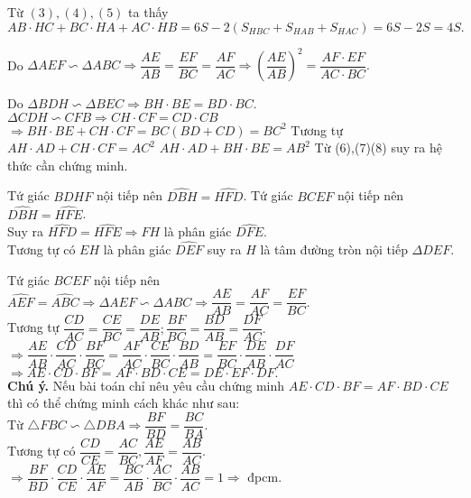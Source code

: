 \begin{bt}
{\begin{listEX}
\noindent	Từ $ (3),(4),(5) $ ta thấy $$ AB\cdot HC +BC\cdot HA +AC\cdot HB  =6S -2(S_{HBC}+S_{HAB}+S_{HAC}) =6S-2S=4S. $$
\item Do $ \Delta AEF \backsim \Delta ABC \Rightarrow \dfrac{AE}{AB}=\dfrac{EF}{BC}=\dfrac{AF}{AC}\Rightarrow \left( \dfrac{AE}{AB}\right)^2 =\dfrac{AF\cdot EF}{AC\cdot BC}. $
\item Do $ \Delta BDH \backsim \Delta BEC \Rightarrow BH\cdot BE =BD\cdot BC. $\\
$ \Delta CDH \backsim CFB \Rightarrow CH \cdot CF =CD\cdot CB$\\
$\Rightarrow BH\cdot BE +CH\cdot CF =BC\left (BD +CD\right ) =BC^2 $ 
Tương tự $ AH\cdot AD +CH\cdot CF =AC^2 $
$ AH\cdot AD +BH\cdot BE =AB^2 $ 
Từ (6),(7)(8) suy ra hệ thức cần chứng minh.
\item Tứ giác $ BDHF $ nội tiếp nên $ \widehat{DBH} =\widehat{HFD} $. Tứ giác $ BCEF $ nội tiếp nên $ \widehat{DBH} =\widehat{HFE} $.\\
Suy ra $ \widehat{HFD} =\widehat{HFE}\Rightarrow FH $ là phân giác $ \widehat{DFE}. $\\
Tương tự có $ EH $ là phân giác $ \widehat{DEF} $ suy ra $ H $ là tâm đường tròn nội tiếp $ \Delta DEF. $
\item Tứ giác $ BCEF $ nội tiếp nên $ \widehat{AEF} =\widehat{ABC}\Rightarrow \Delta AEF \backsim \Delta ABC \Rightarrow \dfrac{AE}{AB}=\dfrac{AF}{AC}=\dfrac{EF}{BC}.$\\
Tương tự $ \dfrac{CD}{AC}=\dfrac{CE}{BC}=\dfrac{DE}{AB}; \dfrac{BF}{BC}=\dfrac{BD}{AB}=\dfrac{DF}{AC}. $\\
$\Rightarrow \dfrac{AE}{AB}\cdot \dfrac{CD}{AC}\cdot \dfrac{BF}{BC} =\dfrac{AF}{AC}\cdot \dfrac{CE}{BC}\cdot \dfrac{BD}{AB}=\dfrac{EF}{BC}\cdot \dfrac{DE}{AB}\cdot \dfrac{DF}{AC} $\\
$ \Rightarrow AE\cdot CD\cdot BF =AF \cdot BD \cdot CE =DE \cdot EF \cdot DF. $\\
\noindent\textbf{Chú ý.} Nếu bài toán chỉ nêu yêu cầu chứng minh $ AE\cdot CD\cdot BF =AF\cdot BD\cdot CE  $ thì có thể chứng minh cách khác như sau:\\
Từ $ \triangle FBC\backsim \triangle DBA\Rightarrow \dfrac{BF}{BD}=\dfrac{BC}{BA}. $\\
Tương tự có $ \dfrac{CD}{CE}=\dfrac{AC}{BC}, \dfrac{AE}{AF}=\dfrac{AB}{AC} .$
\\
$ \Rightarrow \dfrac{BF}{BD}\cdot \dfrac{CD}{CE}\cdot \dfrac{AE}{AF} =\dfrac{BC}{AB}\cdot \dfrac{AC}{BC}\cdot \dfrac{AB}{AC} =1\Rightarrow $ đpcm.

\end{listEX}}
\end{bt}

